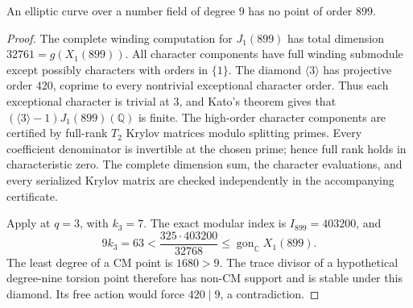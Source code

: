 \begin{proposition}\label{prop:nonic-no899}
An elliptic curve over a number field of degree $9$ has no point of order $899$.
\end{proposition}
\begin{proof}
The complete winding computation for $J_1(899)$ has total dimension
$32761=g(X_1(899))$. All character components have full winding submodule
except possibly characters with orders in
$\{1\}$.
The diamond $\langle3\rangle$ has projective order $420$, coprime
to every nontrivial exceptional character order. Thus each exceptional
character is trivial at $3$, and Kato's theorem gives that
$(\langle3\rangle-1)J_1(899)(\mathbb Q)$ is finite.
The high-order character components are certified by full-rank $T_2$
Krylov matrices modulo splitting primes. Every coefficient denominator
is invertible at the chosen prime; hence full rank holds in characteristic zero.
The complete dimension sum, the character evaluations, and every serialized
Krylov matrix are checked independently in the accompanying certificate.

Apply \cite[Proposition~4.4]{DN} at $q=3$, with $k_3=7$.
The exact modular index is $I_{899}=403200$, and
\[
 9k_3=63<\frac{325\cdot403200}{32768}
       \leq\operatorname{gon}_{\mathbb C}X_1(899).
\]
The least degree of a CM point is $1680>9$.
The trace divisor of a hypothetical degree-nine torsion point therefore
has non-CM support and is stable under this diamond.
Its free action would force $420\mid9$, a contradiction.
\end{proof}
